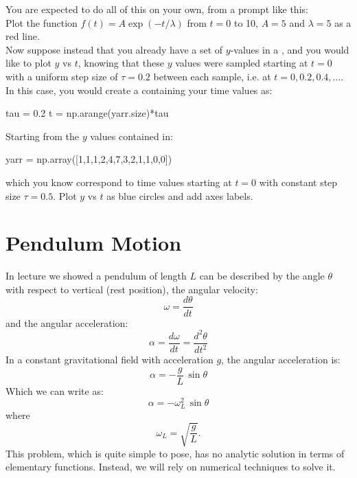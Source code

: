 You are expected to do all of this on your own, from a prompt like this:\\

\plot Plot the function $f(t) = A \exp(-t/\lambda)$ from $t=0$ to 10, $A=5$ and $\lambda=5$ as a red line. \\

Now suppose instead that you already have a set of $y$-values in a  , and you would like to plot $y$ vs $t$, knowing that these $y$ values were sampled starting at $t=0$ with a uniform step size of $\tau=0.2$ between each sample, i.e. at $t=0, 0.2, 0.4, \ldots$.  In this case, you would create a  containing your time values as:
\begin{python}
tau = 0.2
t = np.arange(yarr.size)*tau
\end{python} 
\vskip 0.25cm

\plot Starting from the $y$ values contained in:
\begin{python}
yarr = np.array([1,1,1,2,4,7,3,2,1,1,0,0])
\end{python}
which you know correspond to time values starting at $t=0$ with constant step size $\tau=0.5$.  Plot $y$ vs $t$ as blue circles and add axes labels.

\section{Pendulum Motion}

In lecture we showed a pendulum of length $L$ can be described by the angle $\theta$ with respect to vertical (rest position), the angular velocity:
\begin{displaymath}
\omega = \frac{d\theta}{dt}
\end{displaymath}
and the angular acceleration:
\begin{displaymath}
\alpha = \frac{d\omega}{dt} = \frac{d^2\theta}{dt^2} 
\end{displaymath}
In a constant gravitational field with acceleration $g$, the angular acceleration is:
\begin{displaymath}
\alpha = -\frac{g}{L} \, \sin \theta
\end{displaymath}
Which we can write as:
\begin{displaymath}
\alpha = - \omega_L^2 \, \sin \theta
\end{displaymath}
where
\begin{displaymath}
\omega_L = \sqrt{\frac{g}{L}}.
\end{displaymath}
This problem, which is quite simple to pose, has no analytic solution
in terms of elementary functions.  Instead, we will rely on numerical
techniques to solve it.\\

